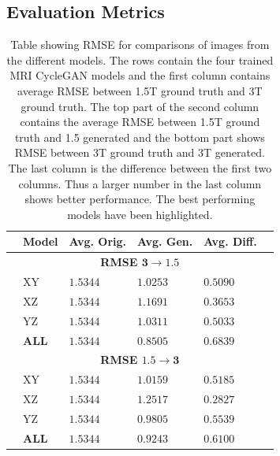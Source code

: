\documentclass[11pt, fleqn, titlepage]{article}
\newcommand{\1}[1]{\mathds{1}\left[#1\right]}
\begin{document}
\subsection{Evaluation Metrics}\label{result_evaluation_metrics}
\begin{table}[H]
	\begin{center}
		\begin{tabular}{l l l l l l}
			\toprule
			& \textbf{Model} & \textbf{Avg. Orig.} & \textbf{Avg. Gen.} & \textbf{Avg. Diff.} & \\ \midrule
			&              \multicolumn{4}{c}{\textbf{RMSE $\mathbf{3\rightarrow1.5}$}}         & \\
			&XY                & $1.5344$            & $1.0253$           & $0.5090$            & \\
			&XZ                & $1.5344$            & $1.1691$           & $0.3653$            & \\
			&YZ                & $1.5344$            & $1.0311$           & $0.5033$            & \\
			&\textbf{ALL}               & $\mathbf{1.5344}$            & $\mathbf{0.8505}$           & $\mathbf{0.6839}$            & \\
			&            \multicolumn{4}{c}{\textbf{RMSE $\mathbf{1.5\rightarrow3}$}}           & \\
			&XY                & $1.5344$            & $1.0159$           & $0.5185$            & \\
			&XZ                & $1.5344$            & $1.2517$			  & $0.2827$            & \\
			&YZ                & $1.5344$            & $0.9805$           & $0.5539$            & \\
			&\textbf{ALL}               & $\mathbf{1.5344}$            & $\mathbf{0.9243}$           & $\mathbf{0.6100}$            & \\
			 \bottomrule
		\end{tabular}
		\caption{Table showing RMSE for comparisons of images from the different models. The rows contain the four trained MRI CycleGAN models and the first column contains average RMSE between 1.5T ground truth and 3T ground truth. The top part of the second column contains the average RMSE between 1.5T ground truth and 1.5 generated and the bottom part shows RMSE between 3T ground truth and 3T generated. The last column is the difference between the first two columns. Thus a larger number in the last column shows better performance. The best performing models have been highlighted.}
		\label{tab:metrics_rmse}
	\end{center}
\end{table}
\end{document}
